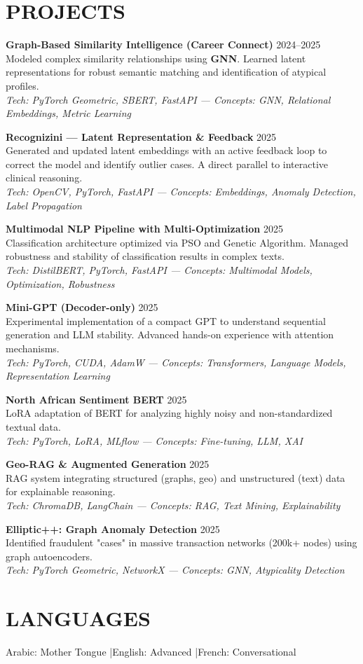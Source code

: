\documentclass[a4paper,12pt]{article}
\begin{document}
\section{PROJECTS}
\setlength{\parskip}{6pt}
{\small

\textbf{Graph-Based Similarity Intelligence (Career Connect)} \hfill 2024--2025 \\
Modeled complex similarity relationships using \textbf{GNN}. Learned latent representations for robust semantic matching and identification of atypical profiles. \\
\textit{Tech: PyTorch Geometric, SBERT, FastAPI — Concepts: GNN, Relational Embeddings, Metric Learning}

\textbf{Recognizini — Latent Representation \& Feedback} \hfill 2025 \\
Generated and updated latent embeddings with an active feedback loop to correct the model and identify outlier cases. A direct parallel to interactive clinical reasoning. \\
\textit{Tech: OpenCV, PyTorch, FastAPI — Concepts: Embeddings, Anomaly Detection, Label Propagation}

\textbf{Multimodal NLP Pipeline with Multi-Optimization} \hfill 2025 \\
Classification architecture optimized via PSO and Genetic Algorithm. Managed robustness and stability of classification results in complex texts. \\
\textit{Tech: DistilBERT, PyTorch, FastAPI — Concepts: Multimodal Models, Optimization, Robustness}

\textbf{Mini-GPT (Decoder-only)} \hfill 2025 \\
Experimental implementation of a compact GPT to understand sequential generation and LLM stability. Advanced hands-on experience with attention mechanisms. \\
\textit{Tech: PyTorch, CUDA, AdamW — Concepts: Transformers, Language Models, Representation Learning}

\textbf{North African Sentiment BERT} \hfill 2025 \\
LoRA adaptation of BERT for analyzing highly noisy and non-standardized textual data. \\
\textit{Tech: PyTorch, LoRA, MLflow — Concepts: Fine-tuning, LLM, XAI}

\textbf{Geo-RAG \& Augmented Generation} \hfill 2025 \\
RAG system integrating structured (graphs, geo) and unstructured (text) data for explainable reasoning. \\
\textit{Tech: ChromaDB, LangChain — Concepts: RAG, Text Mining, Explainability}

\textbf{Elliptic++: Graph Anomaly Detection} \hfill 2025 \\
Identified fraudulent "cases" in massive transaction networks (200k+ nodes) using graph autoencoders. \\
\textit{Tech: PyTorch Geometric, NetworkX — Concepts: GNN, Atypicality Detection}
}



\section{LANGUAGES}
Arabic: Mother Tongue \quad|\quad English: Advanced \quad|\quad French: Conversational
\end{document}
